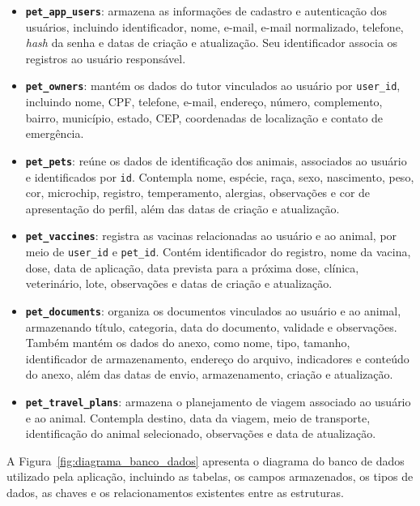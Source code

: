 \documentclass{UNESC}
\begin{document}
\begin{itemize}
    \item \textbf{\texttt{pet\_app\_users}}: armazena as informações de cadastro e autenticação dos usuários, incluindo identificador, nome, e-mail, e-mail normalizado, telefone, \textit{hash} da senha e datas de criação e atualização. Seu identificador associa os registros ao usuário responsável.
    \item \textbf{\texttt{pet\_owners}}: mantém os dados do tutor vinculados ao usuário por \texttt{user\_id}, incluindo nome, CPF, telefone, e-mail, endereço, número, complemento, bairro, município, estado, CEP, coordenadas de localização e contato de emergência.
    \item \textbf{\texttt{pet\_pets}}: reúne os dados de identificação dos animais, associados ao usuário e identificados por \texttt{id}. Contempla nome, espécie, raça, sexo, nascimento, peso, cor, microchip, registro, temperamento, alergias, observações e cor de apresentação do perfil, além das datas de criação e atualização.
    \item \textbf{\texttt{pet\_vaccines}}: registra as vacinas relacionadas ao usuário e ao animal, por meio de \texttt{user\_id} e \texttt{pet\_id}. Contém identificador do registro, nome da vacina, dose, data de aplicação, data prevista para a próxima dose, clínica, veterinário, lote, observações e datas de criação e atualização.
    \item \textbf{\texttt{pet\_documents}}: organiza os documentos vinculados ao usuário e ao animal, armazenando título, categoria, data do documento, validade e observações. Também mantém os dados do anexo, como nome, tipo, tamanho, identificador de armazenamento, endereço do arquivo, indicadores e conteúdo do anexo, além das datas de envio, armazenamento, criação e atualização.
    \item \textbf{\texttt{pet\_travel\_plans}}: armazena o planejamento de viagem associado ao usuário e ao animal. Contempla destino, data da viagem, meio de transporte, identificação do animal selecionado, observações e data de atualização.
\end{itemize}











A Figura~\ref{fig:diagrama_banco_dados} apresenta o diagrama do banco de dados utilizado pela aplicação, incluindo as tabelas, os campos armazenados, os tipos de dados, as chaves e os relacionamentos existentes entre as estruturas.
\end{document}
